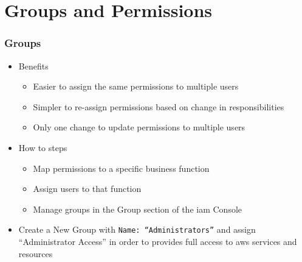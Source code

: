 \documentclass{beamer}
\begin{document}
\section{Groups and Permissions}
\begin{frame}[fragile]
\frametitle{Groups}
\begin{itemize}
\item Benefits
\begin{itemize}
 \item Easier to assign the same permissions to multiple users
 \item Simpler to re-assign permissions based on change in responsibilities
 \item Only one change to update permissions to multiple users
\end{itemize}
\item How to steps
\begin{itemize}
\item Map permissions to a specific business function
\item Assign users to that function
\item Manage groups in the Group section of the \acrshort{iam} Console
\end{itemize}
\item Create a New Group with \texttt{Name: ``Administrators''} and assign ``Administrator Access'' in order to provides full access to \acrshort{aws} services and resources
\end{itemize}
\end{frame}
\end{document}
